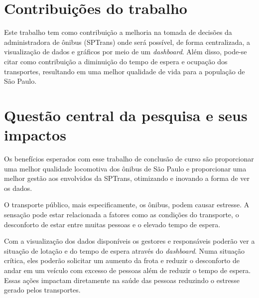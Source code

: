 \section{Contribuições do trabalho}
\indent
\par Este trabalho tem como contribuição a melhoria na tomada de decisões da administradora de ônibus (SPTrans) onde será possível, de forma centralizada, a visualização de dados e gráficos por meio de um \textit{dashboard}. Além disso, pode-se citar como contribuição a diminuição do tempo de espera e ocupação dos transportes, resultando em uma melhor qualidade de vida para a população de São Paulo.

\section{Questão central da pesquisa e seus impactos}
\indent
\par Os benefícios esperados com esse trabalho de conclusão de curso são proporcionar uma melhor qualidade locomotiva dos ônibus de São Paulo e proporcionar uma melhor gestão aos envolvidos da SPTrans, otimizando e inovando a forma de ver os dados.
\indent
\par O transporte público, mais especificamente, os ônibus, podem causar estresse. A sensação pode estar relacionada a fatores como as condições do transporte, o desconforto de estar entre muitas pessoas e o elevado tempo de espera.
\par Com a visualização dos dados disponíveis os gestores e responsáveis poderão ver a situação de lotação e do tempo de espera através do \textit{dashboard}. Numa situação crítica, eles poderão solicitar um aumento da frota e reduzir o desconforto de andar em um veículo com excesso de pessoas além de reduzir o tempo de espera. Essas ações impactam diretamente na saúde das pessoas reduzindo o estresse gerado pelos transportes.
